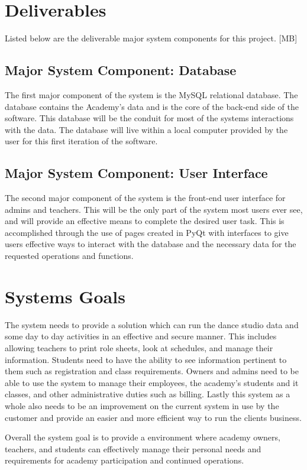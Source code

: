 \section{Deliverables} 
Listed below are the deliverable major system components for this project. [MB]

\subsection{Major System Component: Database}
The first major component of the system is the MySQL relational database. The database contains the Academy's data and is the core of the back-end side of the software. This database will be the conduit for most of the systems interactions with the data. The database will live within a local computer provided by the user for this first iteration of the software.  

\subsection{Major System Component: User Interface}
The second major component of the system is the front-end user interface for admins and teachers. This will be the only part of the system most users ever see, and will provide an effective means to complete the desired user task. This is accomplished through the use of pages created in PyQt with interfaces to give users effective ways to interact with the database and the necessary data for the requested operations and functions.

\section{Systems Goals}
The system needs to provide a solution which can run the dance studio data and some day to day activities in an effective and secure manner. This includes allowing teachers to print role sheets, look at schedules, and manage their information. Students need to have the ability to see information pertinent to them such as registration and class requirements. Owners and admins need to be able to use the system to manage their employees, the academy's students and it classes, and other administrative duties such as billing. Lastly this system as a whole also needs to be an improvement on the current system in use by the customer and provide an easier and more efficient way to run the clients business.

Overall the system goal is to provide a environment where academy owners, teachers, and students can effectively manage their personal needs and requirements for academy participation and continued operations.


